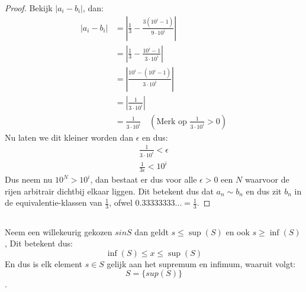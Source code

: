 \documentclass{article}
\newcommand{\tx}[1]{\text{#1}}
\newcommand{\f}[2]{\frac{#1}{#2}}
\begin{document}
\begin{enumerate}[label=\alph*)]
\begin{proof}
              Bekijk $|a_i - b_i|$, dan:
              \begin{align*}
                  |a_i - b_i| & = \left|\f{1}{3}
                  - \f{3(10^i - 1)}{9 \cdot 10^i}\right|   \\
                              & = \left|\f{1}{3}
                  - \f{10^i - 1}{3 \cdot 10^i}
                  \right|                                  \\
                              & = \left|\f{10^i -
                  (10^i - 1)}{3\cdot 10^i}\right|          \\
                              & = \left|\f{1}{3\cdot 10^i}
                  \right|                                  \\
                              & =  \f{1}{3 \cdot 10^i}
                  \quad (\tx{Merk op }
                  \f{1}{3\cdot 10^i } > 0 )
              \end{align*}
              Nu laten we dit kleiner worden dan
              $\epsilon$ en dus:
              \begin{align*}
                  \f{1}{3 \cdot 10^i} < \epsilon \\
                  \f{1}{3 \epsilon} < 10^i
              \end{align*}
              Dus neem nu $10^N > 10^i$,
              dan bestaat er dus voor alle $\epsilon > 0$
              een $N$ waarvoor de rijen arbitrair dichtbij
              elkaar liggen.
              Dit betekent dus dat $a_n \sim b_n$
              en dus zit $b_n$ in de
              equivalentie-klassen van $\f{1}{3}$,
              ofwel $0.33333333\dots = \f{1}{3}$.
          \end{proof}
          \subsection{}
          \subsection{}
          Neem een willekeurig gekozen $s in S$ dan geldt $s \leq \sup(S)$
          en ook $s \geq \inf(S)$, Dit betekent dus:
          \[\inf(S) \leq x \leq \sup(S)\]
          En dus is elk element $s \in S$ gelijk aan het supremum en infimum, waaruit volgt:
          \[S = \{sup(S)\}\].
\end{enumerate}
\end{document}
